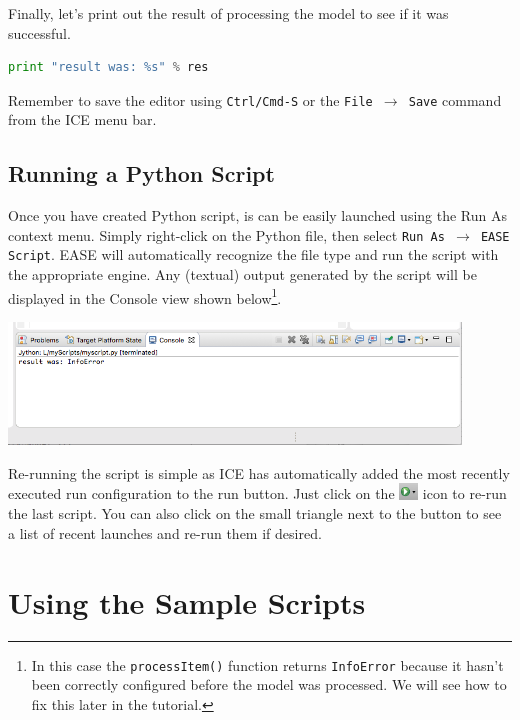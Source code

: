 Finally, let's print out the result of processing the model to see if it was
successful.

\begin{lstlisting}[frame=single,language=Python]
print "result was: %s" % res
\end{lstlisting}

Remember to save the editor using \texttt{Ctrl/Cmd-S} or the \texttt{File
$\rightarrow$ Save} command from the ICE menu bar.

\subsection{Running a Python Script}

Once you have created Python script, is can be easily launched using the Run As
context menu. Simply right-click on the Python file, then select \texttt{Run As
$\rightarrow$ EASE Script}. EASE will automatically recognize the file type and
run the script with the appropriate engine. Any (textual) output generated by
the script will be displayed in the Console view shown below\footnote{
In this case the \texttt{processItem()} function returns \texttt{InfoError}
because it hasn't been correctly configured before the model was processed. We
will see how to fix this later in the tutorial.}.

\begin{center}
\includegraphics[width=12cm]{images/console}
\end{center}

Re-running the script is simple as ICE has automatically added the most recently
executed run configuration to the run button. Just click on the
\includegraphics[width=0.5cm]{images/runbutton} icon to re-run the last script.
You can also click on the small triangle next to the button to see a list of 
recent launches and re-run them if desired. 

\section{Using the Sample Scripts}

